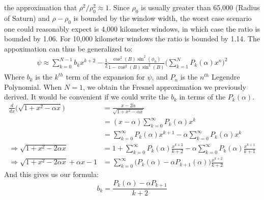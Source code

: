 \documentclass[crop=false,class=book,oneside]{standalone}
\begin{document}
            the approximation that
            $\rho^{2}/\rho_{0}^{2}\approx{1}$.
            Since $\rho_{0}$ is usually greater
            than 65,000 (Radius of Saturn) and
            $\rho-\rho_{0}$ is bounded by the window width,
            the worst case scenario one could reasonably
            expect is 4,000 kilometer windows, in which
            case the ratio is bounded by 1.06. For
            10,000 kilometer windows the ratio is bounded
            by 1.14. The appoximation can thus be
            generalized to:
            \begin{align*}
                \psi\approx
                \sum_{k=0}^{N-1}b_{k}x^{k+2}
                -\frac{1}{2}
                \frac{\cos^{2}(B)\sin^{2}(\phi_{0})}
                     {1-\cos^{2}(B)\sin^{2}(B)}
                \Big(\sum_{k=1}^{N}P_{k}(\alpha)x^{n}\Big)^{2}
            \end{align*}
            Where $b_{k}$ is the $k^{th}$ term of the expansion
            for $\psi$, and $P_{n}$ is the $n^{th}$
            Legendre Polynomial. When $N=1$, we obtain
            the Fresnel approximation we previously
            derived. It would be convenient if we could
            write the $b_{k}$ in terms of the
            $P_{k}(\alpha)$.
            \begin{align*}
                \frac{d}{dx}
                \Big(\sqrt{1+x^{2}-\alpha{x}}\Big)
                &=\frac{x-2\alpha}{\sqrt{1+x^{2}-\alpha{x}}}\\
                &=(x-\alpha)
                  \sum_{k=0}^{\infty}P_{k}(\alpha)x^{k}\\
                &=\sum_{k=0}^{\infty}P_{k}(\alpha)x^{k+1}
                 -\alpha\sum_{k=0}^{\infty}P_{k}(\alpha)x^{k}\\
                \Rightarrow
                \sqrt{1+x^{2}-2\alpha{x}}
                &=1+\sum_{k=0}^{\infty}P_{k}(\alpha)
                    \frac{x^{k+2}}{k+2}
                 -\alpha\sum_{k=0}^{\infty}P_{k}(\alpha)
                  \frac{x^{k+1}}{k+1}\\
                \Rightarrow
                \sqrt{1+x^{2}-2\alpha{x}}+\alpha{x}-1
                &=\sum_{k=0}^{\infty}
                    \Big(
                        P_{k}(\alpha)-\alpha{P_{k+1}}(\alpha)
                    \Big)
                    \frac{x^{k+2}}{k+2}
            \end{align*}
            And this gives us our formula:
            \begin{equation*}
                b_{k}=\frac{P_{k}(\alpha)-\alpha{P}_{k+1}}{k+2}
            \end{equation*}
\end{document}
